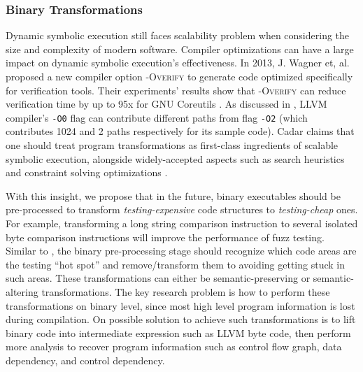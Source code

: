 \documentclass{cta-author}
\begin{document}
\subsubsection{Binary Transformations}
Dynamic symbolic execution still faces scalability problem 
when considering the size and complexity of modern software. 
Compiler optimizations can have a large impact on dynamic 
symbolic execution's effectiveness. 
In 2013, J. Wagner et, al. proposed a new compiler option 
\textsc{-Overify} to generate code optimized specifically 
for verification tools. Their experiments' results show that 
\textsc{-Overify} can reduce verification time by up to 
95x for GNU Coreutils \cite{wagner2013overify}. As discussed 
in \cite{Cadar:2015:TPT}, LLVM compiler's \texttt{-O0} flag 
can contribute different paths from flag \texttt{-O2} (which 
contributes 1024 and 2 paths respectively for its sample code).
Cadar claims that one should treat program transformations as 
first-class ingredients of scalable symbolic execution, 
alongside widely-accepted aspects such as search heuristics 
and constraint solving optimizations \cite{Cadar:2015:TPT}. 

With this insight, we propose that in the future, binary executables 
should be pre-processed to transform \textit{testing-expensive} 
code structures to \textit{testing-cheap} ones. For example, transforming
a long string comparison instruction to several isolated byte comparison
instructions will improve the performance of fuzz testing.
Similar to \cite{wagner2015high}, the binary pre-processing stage 
should recognize which code areas are the testing ``hot spot'' and 
remove/transform them to avoiding getting stuck in such areas.
These transformations can either be semantic-preserving or 
semantic-altering transformations. The key research problem is how 
to perform these transformations on binary level, since most 
high level program information is lost during compilation. 
On possible solution to achieve such transformations is to lift 
binary code into intermediate expression such as LLVM byte code, 
then perform more analysis to recover program information such 
as control flow graph, data dependency, and control dependency. 
\end{document}
